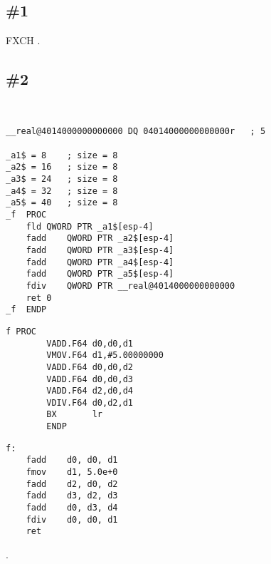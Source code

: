 \section{\Exercises}

\subsection{\Exercise \#1}

 FXCH  
 .

\subsection{\Exercise \#2}
\label{exercise_FPU_2}

\WhatThisCodeDoes\

\begin{lstlisting}[caption=\Optimizing MSVC 2010]
__real@4014000000000000 DQ 04014000000000000r	; 5

_a1$ = 8	; size = 8
_a2$ = 16	; size = 8
_a3$ = 24	; size = 8
_a4$ = 32	; size = 8
_a5$ = 40	; size = 8
_f	PROC
	fld	QWORD PTR _a1$[esp-4]
	fadd	QWORD PTR _a2$[esp-4]
	fadd	QWORD PTR _a3$[esp-4]
	fadd	QWORD PTR _a4$[esp-4]
	fadd	QWORD PTR _a5$[esp-4]
	fdiv	QWORD PTR __real@4014000000000000
	ret	0
_f	ENDP
\end{lstlisting}

\begin{lstlisting}[caption=\NonOptimizingKeilVI (\ThumbMode{} / \RU{скомпилировано для}\EN{compiled for} Cortex-R4F CPU)]
f PROC
        VADD.F64 d0,d0,d1
        VMOV.F64 d1,#5.00000000
        VADD.F64 d0,d0,d2
        VADD.F64 d0,d0,d3
        VADD.F64 d2,d0,d4
        VDIV.F64 d0,d2,d1
        BX       lr
        ENDP
\end{lstlisting}

\begin{lstlisting}[caption=\Optimizing GCC 4.9 (ARM64)]
f:
	fadd	d0, d0, d1
	fmov	d1, 5.0e+0
	fadd	d2, d0, d2
	fadd	d3, d2, d3
	fadd	d0, d3, d4
	fdiv	d0, d0, d1
	ret
\end{lstlisting}



\Answer\: .
